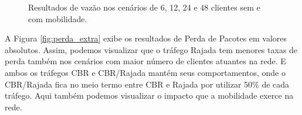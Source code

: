 \documentclass[12pt]{article}
\begin{document}
\begin{figure}[!ht]
	\centering
	\caption{Resultados de vazão nos cenários de 6, 12, 24 e 48 clientes sem e com mobilidade.}
	\label{fig:vazao_extra_648}
\end{figure}

A Figura \ref{fig:perda_extra} exibe os resultados de Perda de Pacotes em valores absolutos. Assim, podemos visualizar que o tráfego Rajada tem menores taxas de perda também nos cenários com maior número de clientes atuantes na rede. E ambos os tráfegos CBR e CBR/Rajada mantém seus comportamentos, onde o CBR/Rajada fica no meio termo entre CBR e Rajada por utilizar 50\% de cada tráfego. Aqui também podemos visualizar o impacto que a mobilidade exerce na rede.
\end{document}

